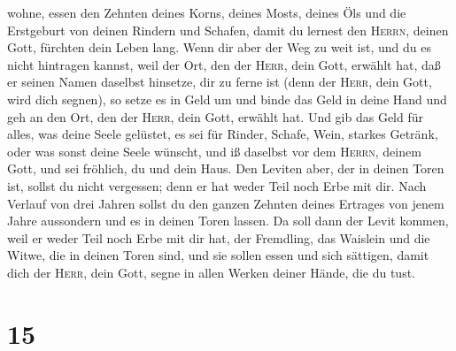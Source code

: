 wohne, essen den Zehnten deines Korns, deines Mosts, deines Öls und die
Erstgeburt von deinen Rindern und Schafen, damit du lernest den
\textsc{Herrn}, deinen Gott, fürchten dein Leben lang. 
Wenn dir aber der Weg zu weit ist, und du es nicht hintragen kannst,
weil der Ort, den der \textsc{Herr}, dein Gott, erwählt hat, daß er
seinen Namen daselbst hinsetze, dir zu ferne ist (denn der
\textsc{Herr}, dein Gott, wird dich segnen),  so setze es
in Geld um und binde das Geld in deine Hand und geh an den Ort, den der
\textsc{Herr}, dein Gott, erwählt hat.  Und gib das Geld
für alles, was deine Seele gelüstet, es sei für Rinder, Schafe, Wein,
starkes Getränk, oder was sonst deine Seele wünscht, und iß daselbst vor
dem \textsc{Herrn}, deinem Gott, und sei fröhlich, du und dein Haus.
 Den Leviten aber, der in deinen Toren ist, sollst du
nicht vergessen; denn er hat weder Teil noch Erbe mit dir.
 Nach Verlauf von drei Jahren sollst du den ganzen
Zehnten deines Ertrages von jenem Jahre aussondern und es in deinen
Toren lassen.  Da soll dann der Levit kommen, weil er
weder Teil noch Erbe mit dir hat, der Fremdling, das Waislein und die
Witwe, die in deinen Toren sind, und sie sollen essen und sich sättigen,
damit dich der \textsc{Herr}, dein Gott, segne in allen Werken deiner
Hände, die du tust.

\hypertarget{section-14}{%
\section{15}\label{section-14}}

